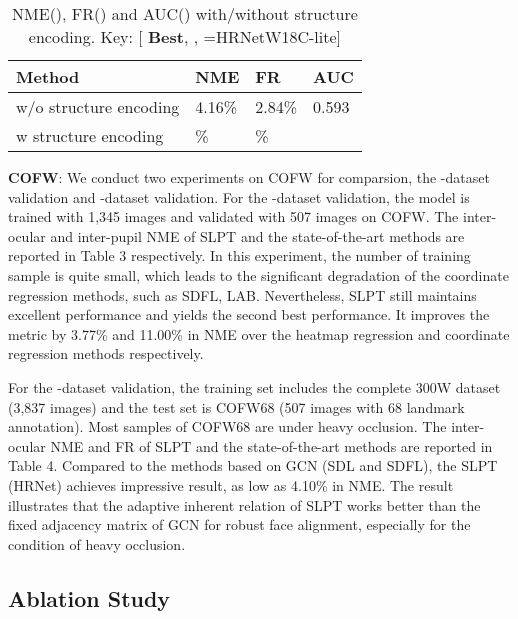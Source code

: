 \documentclass[10pt,twocolumn,letterpaper]{article}
\begin{document}
\begin{table}[t!]
	\centering
	\begin{tabular}{|m{3.4cm}<{\centering}|m{1.0cm}<{\centering}|m{1.0cm}<{\centering}|m{0.85cm}<{\centering}|}
		\hline
		Method & NME & FR & AUC \\ \hline
		w/o structure encoding &  4.16\% & 2.84\% & 0.593 \\ \hline
		w structure encoding &  {\color{red} }\% & {\color{red} }\% & {\color{red} } \\ \hline
	\end{tabular}
	\caption{NME(), FR() and AUC() with/without structure encoding. Key: [{\color{red} \textbf{Best}}, , =HRNetW18C-lite]}
	\label{Tabal7}
\end{table}

\textbf{COFW}: We conduct two experiments on COFW for comparsion, the -dataset validation and -dataset validation. For the -dataset validation, the model is trained with 1,345 images and validated with 507 images on COFW. The inter-ocular and inter-pupil NME of SLPT and the state-of-the-art methods are reported in Table 3 respectively. In this experiment, the number of training sample is quite small, which leads to the significant degradation of the coordinate regression methods, such as SDFL, LAB. Nevertheless, SLPT still maintains excellent performance and yields the second best performance. It improves the metric by 3.77\% and 11.00\% in NME over the heatmap regression and coordinate regression methods respectively.

For the -dataset validation, the training set includes the complete 300W dataset (3,837 images) and the test set is COFW68 (507 images with 68 landmark annotation). Most samples of COFW68 are under heavy occlusion. The inter-ocular NME and FR of SLPT and the state-of-the-art methods are reported in Table 4. Compared to the methods based on GCN (SDL and SDFL), the SLPT (HRNet) achieves impressive result, as low as 4.10\% in NME. The result illustrates that the adaptive inherent relation of SLPT works better than the fixed adjacency matrix of GCN for robust face alignment, especially for the condition of heavy occlusion.

\subsection{Ablation Study}
\end{document}
